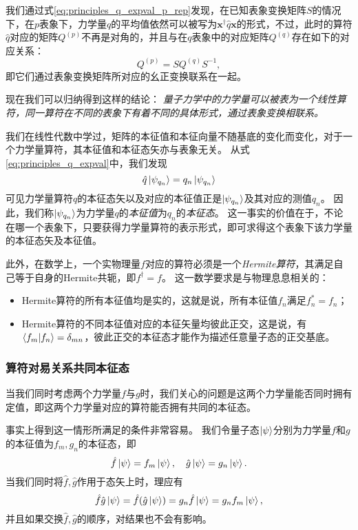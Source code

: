 我们通过式\eqref{eq:principles_q_expval_p_rep}发现，在已知表象变换矩阵$S$的情况下，在$p$表象下，力学量$q$的平均值依然可以被写为$\bm{x}^\dag \hat{q}\bm{x}$的形式，不过，此时的算符$\hat{q}$对应的矩阵$Q^{(p)}$不再是对角的，并且与在$q$表象中的对应矩阵$Q^{(q)}$存在如下的对应关系：
\begin{equation}
    Q^{(p)} = S Q^{(q)} S^{-1},
\end{equation}
即它们通过表象变换矩阵所对应的幺正变换联系在一起。

现在我们可以归纳得到这样的结论：
\emph{量子力学中的力学量可以被表为一个线性算符，同一算符在不同的表象下有着不同的具体形式，通过表象变换相联系。}

我们在线性代数中学过，矩阵的本征值和本征向量不随基底的变化而变化，对于一个力学量算符，其本征值和本征态矢亦与表象无关。
从式\eqref{eq:principles_q_expval}中，我们发现
\begin{equation}
    \hat{q} \ket{\psi_{q_n}} = q_n \ket{\psi_{q_n}}
\end{equation}
可见力学量算符$q$的本征态矢以及对应的本征值正是$\ket{\psi_{q_n}}$及其对应的测值$q_n$。
因此，我们称$\ket{\psi_{q_n}}$为力学量$q$的\emph{本征值}为$q_n$的\emph{本征态}。
这一事实的价值在于，不论在哪一个表象下，只要获得力学量算符的表示形式，即可求得这个表象下该力学量的本征态矢及本征值。

此外，在数学上，一个实物理量$f$对应的算符必须是一个\emph{Hermite算符}，其满足自己等于自身的Hermite共轭，即$f^\dag=f$。
这一数学要求是与物理息息相关的：
\begin{itemize}
    \item{Hermite算符的所有本征值均是实的，这就是说，所有本征值$f_n$满足$f_n^*=f_n$；}
    \item{Hermite算符的不同本征值对应的本征矢量均彼此正交，这是说，有$\braket{f_m}{f_n} = \delta_{mn}$，彼此正交的本征态才能作为描述任意量子态的正交基底。}
\end{itemize}


\subsubsection{\texorpdfstring{算符对易关系\quad 共同本征态}{算符对易关系  共同本征态}}

当我们同时考虑两个力学量$f$与$g$时，我们关心的问题是这两个力学量能否同时拥有定值，即这两个力学量对应的算符能否拥有共同的本征态。

事实上得到这一情形所满足的条件非常容易。
我们令量子态$\ket{\psi}$分别为力学量$f$和$g$的本征值为$f_m, g_n$的本征态，即
\begin{equation}
    \hat{f}\ket{\psi} = f_m\ket{\psi},\quad \hat{g}\ket{\psi} = g_n\ket{\psi}.
\end{equation}
当我们同时将$\hat{f},\hat{g}$作用于态矢上时，理应有
\begin{equation}
    \hat{f}\hat{g}\ket{\psi} = \hat{f}(\hat{g}\ket{\psi}) = g_n \hat{f}\ket{\psi} = g_n f_m \ket{\psi},
\end{equation}
并且如果交换$\hat{f},\hat{g}$的顺序，对结果也不会有影响。

